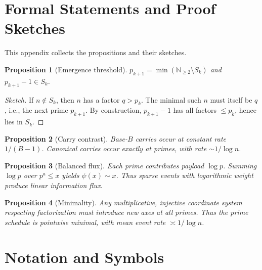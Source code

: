 \documentclass[11pt]{article}
\theoremstyle{plain}
\newtheorem{proposition}{Proposition}
\theoremstyle{definition}
\newcommand{\N}{\mathbb{N}}
\begin{document}
\section{Formal Statements and Proof Sketches}\label{app:proofs}

This appendix collects the propositions and their sketches.

\begin{proposition}[Emergence threshold]
$p_{k+1} = \min(\N_{\geq 2} \setminus S_k)$ and $p_{k+1}-1 \in S_k$.  
\end{proposition}
\begin{proof}[Sketch]
If $n \notin S_k$, then $n$ has a factor $q > p_k$. The minimal such $n$ must itself be $q$, i.e., the next prime $p_{k+1}$. By construction, $p_{k+1}-1$ has all factors $\leq p_k$, hence lies in $S_k$.
\end{proof}

\begin{proposition}[Carry contrast]
Base-$B$ carries occur at constant rate $1/(B-1)$. Canonical carries occur exactly at primes, with rate $\sim 1/\log n$.
\end{proposition}

\begin{proposition}[Balanced flux]
Each prime contributes payload $\log p$. Summing $\log p$ over $p^a \leq x$ yields $\psi(x) \sim x$. Thus sparse events with logarithmic weight produce linear information flux.
\end{proposition}

\begin{proposition}[Minimality]
Any multiplicative, injective coordinate system respecting factorization must introduce new axes at all primes. Thus the prime schedule is pointwise minimal, with mean event rate $\asymp 1/\log n$.
\end{proposition}

\section{Notation and Symbols}\label{app:notation}
\end{document}
